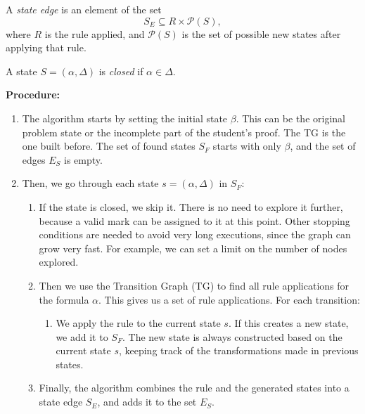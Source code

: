 \documentclass[runningheads]{llncs}
\begin{document}
\begin{definition}
A \emph{state edge} is an element of the set
\[
S_E \subseteq R \times \mathcal{P}(S),
\]
where \(R\) is the rule applied, and \(\mathcal{P}(S)\) is the set of possible new states after applying that rule.
\end{definition}

\begin{definition}
A state \(S = (\alpha, \Delta)\) is \emph{closed} if \(\alpha \in \Delta\).
\end{definition}

\vspace{1em}
\textbf{Procedure:}

\begin{enumerate}
    \item The algorithm starts by setting the initial state \(\beta\). This can be the original problem state or the incomplete part of the student's proof. The TG is the one built before. The set of found states \(S_F\) starts with only \(\beta\), and the set of edges \(E_S\) is empty.

    \item Then, we go through each state \(s = (\alpha, \Delta)\) in \(S_F\):

    \begin{enumerate}
        \item If the state is closed, we skip it. There is no need to explore it further, because a valid mark can be assigned to it at this point. Other stopping conditions are needed to avoid very long executions, since the graph can grow very fast. For example, we can set a limit on the number of nodes explored.

        \item Then we use the Transition Graph (TG) to find all rule applications for the formula \(\alpha\). This gives us a set of rule applications. For each transition:

        \begin{enumerate}
            \item We apply the rule to the current state \(s\). If this creates a new state, we add it to \(S_F\). The new state is always constructed based on the current state \(s\), keeping track of the transformations made in previous states.
        \end{enumerate}

        \item Finally, the algorithm combines the rule and the generated states into a state edge \(S_E\), and adds it to the set \(E_S\).
    \end{enumerate}
\end{enumerate}
\end{document}
